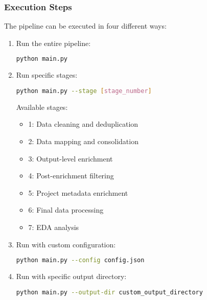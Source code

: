 \documentclass[12pt]{article}
\begin{document}
\subsubsection{Execution Steps}
The pipeline can be executed in four different ways:

\begin{enumerate}
    \item Run the entire pipeline:
    \begin{lstlisting}[language=bash]
    python main.py
    \end{lstlisting}
    
    \item Run specific stages:
    \begin{lstlisting}[language=bash]
    python main.py --stage [stage_number]
    \end{lstlisting}
    Available stages:
    \begin{itemize}
        \item 1: Data cleaning and deduplication
        \item 2: Data mapping and consolidation
        \item 3: Output-level enrichment
        \item 4: Post-enrichment filtering
        \item 5: Project metadata enrichment
        \item 6: Final data processing
        \item 7: EDA analysis
    \end{itemize}
    
    \item Run with custom configuration:
    \begin{lstlisting}[language=bash]
    python main.py --config config.json
    \end{lstlisting}
    
    \item Run with specific output directory:
    \begin{lstlisting}[language=bash]
    python main.py --output-dir custom_output_directory
    \end{lstlisting}
\end{enumerate}
\end{document}
